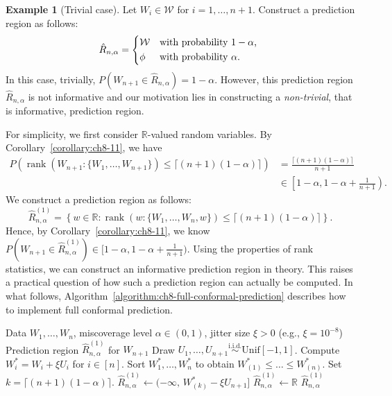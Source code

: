 \documentclass[a4paper,12pt]{article}
\numberwithin{equation}{section}
\newcommand{\iid}{\overset{\text{i.i.d.}}{\sim}}
\theoremstyle{plain}
\theoremstyle{definition}
\newtheorem{example}[theorem]{Example}
\theoremstyle{remark}
\begin{document}
\begin{example}[Trivial case]
    Let $W_i\in\mathcal{W}$ for $i=1,\dots,n+1$. Construct a prediction region as follows:
    \begin{equation*}
        \hat{R}_{n,\alpha}=
        \begin{cases*}
            \mathcal{W} & with probability $1-\alpha$, \\
            \phi & with probability $\alpha$.
        \end{cases*}
    \end{equation*}
    In this case, trivially, $P(W_{n+1}\in\hat{R}_{n,\alpha})=1-\alpha$. However, this prediction region $\hat{R}_{n,\alpha}$ is not informative and our motivation lies in constructing a \emph{non-trivial}, that is informative, prediction region. 
\end{example}

For simplicity, we first consider $\mathbb{R}$-valued random variables. By Corollary~\ref{corollary:ch8-11}, we have
\begin{align}
    P\left(\operatorname{rank}\left(W_{n+1}:\{W_1,\dots,W_{n+1}\}\right)\leq \lceil(n+1)(1-\alpha)\rceil\right)
    &=\frac{\lceil(n+1)(1-\alpha)\rceil}{n+1}\nonumber\\
    &\in \left[1-\alpha,1-\alpha+\frac{1}{n+1}\right).
    \label{eq:ch8-12}
\end{align}
We construct a prediction region as follows:
\begin{equation}
    \hat{R}_{n,\alpha}^{(1)}=\left\{w\in\mathbb{R}:\operatorname{rank}(w:\{W_1,\dots,W_n,w\})\leq \lceil(n+1)(1-\alpha)\rceil\right\}.
    \label{eq;ch8-13}
\end{equation}
Hence, by Corollary~\ref{corollary:ch8-11}, we know $P(W_{n+1}\in\hat{R}_{n,\alpha}^{(1)})\in [1-\alpha,1-\alpha+\frac{1}{n+1})$. Using the properties of rank statistics, we can construct an informative prediction region in theory. This raises a practical question of how such a prediction region can actually be computed. In what follows, Algorithm~\ref{algorithm:ch8-full-conformal-prediction} describes how to implement full conformal prediction.

\begin{algorithm}
\caption{Full conformal prediction}
\label{algorithm:ch8-full-conformal-prediction}
\begin{algorithmic}[1]
  \Require Data $W_1,\dots,W_n$, miscoverage level $\alpha\in(0,1)$, jitter size $\xi>0$ (e.g., $\xi=10^{-8}$)
  \Ensure Prediction region $\hat{R}_{n,\alpha}^{(1)}$ for $W_{n+1}$
  \State Draw $U_1,\dots,U_{n+1}\iid\mathrm{Unif}[-1,1]$.
  \State Compute $W_i^*=W_i+\xi U_i$ for $i\in[n]$.
  \State Sort $W_1^*,\dots,W_n^*$ to obtain $W_{(1)}^*\le\dots\le W_{(n)}^*$.
  \State Set $k=\lceil(n+1)(1-\alpha)\rceil$.
    \State $\hat{R}_{n,\alpha}^{(1)}\gets(-\infty,\,W_{(k)}^*-\xi U_{n+1}]$
  \Else
    \State $\hat{R}_{n,\alpha}^{(1)}\gets\mathbb{R}$
  \EndIf
  \State \Return $\hat{R}_{n,\alpha}^{(1)}$
\end{algorithmic}
\end{algorithm}
\end{document}
